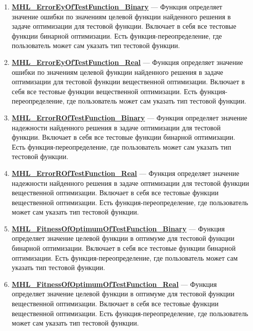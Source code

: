 \documentclass[a4paper,12pt]{article}
\begin{document}
\begin{enumerate}
\item \textbf{\hyperref[MHL_ErrorEyOfTestFunction_Binary]{MHL\_ErrorEyOfTestFunction\_Binary}} --- Функция определяет значение ошибки по значениям целевой функции найденного решения в задаче оптимизации для тестовой функции. Включает в себя все тестовые функции бинарной оптимизации. Есть функция-переопределение, где пользователь может сам указать тип тестовой функции.

\item \textbf{\hyperref[MHL_ErrorEyOfTestFunction_Real]{MHL\_ErrorEyOfTestFunction\_Real}} --- Функция определяет значение ошибки по значениям целевой функции найденного решения в задаче оптимизации для тестовой функции вещественной оптимизации. Включает в себя все тестовые функции вещественной оптимизации. Есть функция-переопределение, где пользователь может сам указать тип тестовой функции.

\item \textbf{\hyperref[MHL_ErrorROfTestFunction_Binary]{MHL\_ErrorROfTestFunction\_Binary}} --- Функция определяет значение надежности найденного решения в задаче оптимизации для тестовой функции. Включает в себя все тестовые функции бинарной оптимизации. Есть функция-переопределение, где пользователь может сам указать тип тестовой функции.

\item \textbf{\hyperref[MHL_ErrorROfTestFunction_Real]{MHL\_ErrorROfTestFunction\_Real}} --- Функция определяет значение надежности найденного решения в задаче оптимизации для тестовой функции вещественной оптимизации. Включает в себя все тестовые функции  вещественной оптимизации. Есть функция-переопределение, где пользователь может сам указать тип тестовой функции.

\item \textbf{\hyperref[MHL_FitnessOfOptimumOfTestFunction_Binary]{MHL\_FitnessOfOptimumOfTestFunction\_Binary}} --- Функция определяет значение целевой функции в оптимуме для тестовой функции бинарной оптимизации. Включает в себя все тестовые функции бинарной оптимизации. Есть функция-переопределение, где пользователь может сам указать тип тестовой функции.

\item \textbf{\hyperref[MHL_FitnessOfOptimumOfTestFunction_Real]{MHL\_FitnessOfOptimumOfTestFunction\_Real}} --- Функция определяет значение целевой функции в оптимуме для тестовой функции вещественной оптимизации. Включает в себя все тестовые функции вещественной оптимизации. Есть функция-переопределение, где пользователь может сам указать тип тестовой функции.


\end{enumerate}
\end{document}
